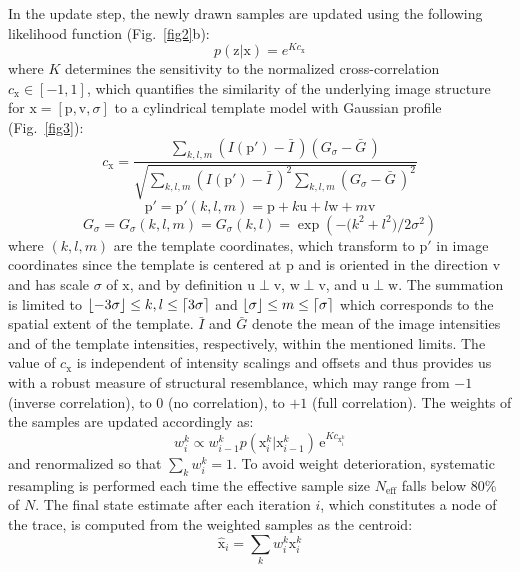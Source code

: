 In the update step, the newly drawn samples are updated using the following likelihood function (Fig.~\ref{fig2}b):
\begin{equation}
p(\mathrm{z} | \mathrm{x}) = e^{K c_{\mathrm{x}}}
\end{equation}
where $K$ determines the sensitivity to the normalized cross-correlation $c_{\mathrm{x}}\in[-1,1]$, which quantifies the similarity of the underlying image structure for $\mathrm{x}=\left[ \mathrm{p}, \mathrm{v}, \sigma \right]$ to a cylindrical template model with Gaussian profile (Fig.~\ref{fig3}):
\begin{equation}
\label{eq:corr}
c_\mathrm{x} = 
\frac{
	\sum_{k,l,m}
	\left(I(\mathrm{p}')-\bar{I}\,\right) \left(G_{\sigma}-\bar{G}\,\right)
}{
	\!\!\sqrt{
		\sum_{k,l,m}\left(I(\mathrm{p}')-\bar{I}\,\right)^2
		\sum_{k,l,m}\left(G_{\sigma}-\bar{G}\,\right)^2}
}
\end{equation}
\begin{equation}
\label{eq:pp}
\mathrm{p}' = \mathrm{p}'(k,l,m) =  \mathrm{p} + k \mathrm{u} + l \mathrm{w} + m \mathrm{v}
\end{equation}
\begin{equation}
\label{eq:template}
G_{\sigma} = G_{\sigma}(k,l,m)=G_{\sigma}(k,l)=\exp\left(-\big(k^2+l^2\big)/2\sigma^2\right)
\end{equation} 
where $(k,l,m)$ are the template coordinates, which transform to $\mathrm{p}'$ in image coordinates since the template is centered at $\mathrm{p}$ and is oriented in the direction $\mathrm{v}$ and has  scale $\sigma$ of $\mathrm{x}$, and by definition $\mathrm{u} \! \perp \! \mathrm{v}$, $\mathrm{w} \! \perp \! \mathrm{v}$, and $\mathrm{u} \! \perp \! \mathrm{w}$. The summation is limited to $\floor*{-3\sigma} \leq k, l \leq \ceil*{3\sigma}$ and $\floor*{\sigma} \leq m \leq \ceil*{\sigma}$ which corresponds to the spatial extent of the template. $\bar{I}$ and $\bar{G}$ denote the mean of the image intensities and of the template intensities, respectively, within the mentioned limits. The value of $c_\mathrm{x}$ is independent of intensity scalings and offsets and thus provides us with a robust measure of structural resemblance, which may range from $-1$ (inverse correlation), to $0$ (no correlation), to $+1$ (full correlation). The weights of the samples are updated accordingly as:
\begin{equation} 
\label{eq:w-update}
w_i^k \propto w_{i-1}^k
p(\mathrm{x}_{i}^k | \mathrm{x}_{i-1}^k)
\,\textrm{e}^{K c_{\mathrm{x}_i^k}}
\end{equation}
and renormalized so that $\sum_k w_i^k = 1$. To avoid weight deterioration, systematic resampling \cite{kitagawa1996monte} is performed each time the effective sample size $N_{\text{eff}}$ \cite{kong1994sequential} falls below 80\% of $N$. The final state estimate after each iteration $i$, which constitutes a node of the trace, is computed from the weighted samples as the centroid:
\begin{equation} 
\hat{\mathrm{x}}_i = \sum_k w_i^k \mathrm{x}_i^k
\end{equation} 

